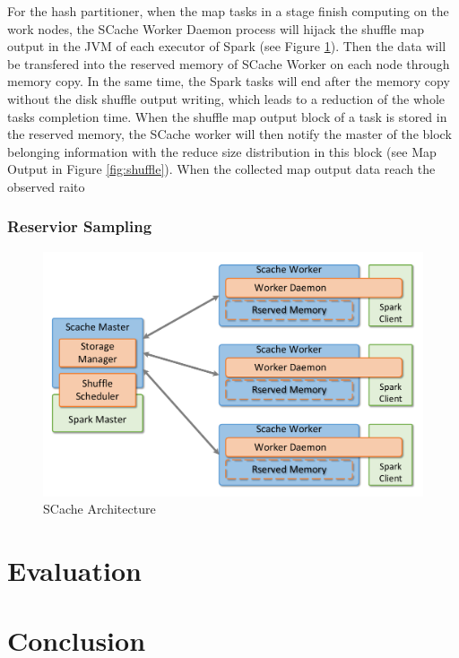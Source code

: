 \documentclass[10pt,twocolumn]{article}
\begin{document}
For the hash partitioner, when the map tasks in a stage finish computing on the work nodes, the  SCache Worker Daemon process will hijack the shuffle map output in the JVM of each executor of Spark (see Figure \ref{fig:arch}). Then the data will be transfered into the reserved memory of SCache Worker on each node through memory copy. In the same time, the Spark tasks will end after the memory copy without the disk shuffle output writing, which leads to a  reduction of the whole tasks completion time. When the shuffle map output block of a task is stored in the reserved memory, the SCache worker will then notify the master of the block belonging information with the reduce size distribution in this block (see Map Output in Figure \ref{fig:shuffle}). When the collected map output data reach the observed raito 

\subsubsection{Reservior Sampling}\label{sampling}
\begin{figure}
	\centering
	\includegraphics[width=\linewidth]{fig/arch}
	\caption{SCache Architecture}
	\label{fig:arch}
\end{figure}
\section{Evaluation}\label{evaluation}

\section{Conclusion}





\end{document}
